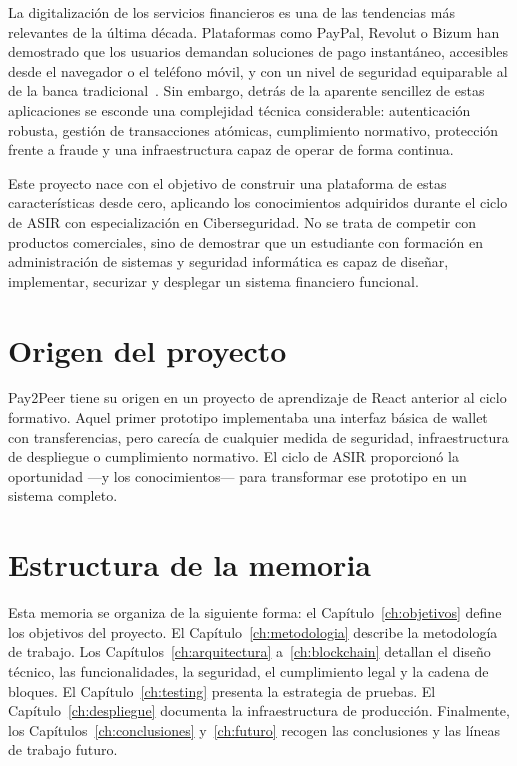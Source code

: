 La digitalización de los servicios financieros es una de las tendencias más relevantes de la última década. Plataformas como PayPal, Revolut o Bizum han demostrado que los usuarios demandan soluciones de pago instantáneo, accesibles desde el navegador o el teléfono móvil, y con un nivel de seguridad equiparable al de la banca tradicional~\cite{owasp}. Sin embargo, detrás de la aparente sencillez de estas aplicaciones se esconde una complejidad técnica considerable: autenticación robusta, gestión de transacciones atómicas, cumplimiento normativo, protección frente a fraude y una infraestructura capaz de operar de forma continua.

Este proyecto nace con el objetivo de construir una plataforma de estas características desde cero, aplicando los conocimientos adquiridos durante el ciclo de ASIR con especialización en Ciberseguridad. No se trata de competir con productos comerciales, sino de demostrar que un estudiante con formación en administración de sistemas y seguridad informática es capaz de diseñar, implementar, securizar y desplegar un sistema financiero funcional.

\section{Origen del proyecto}

Pay2Peer tiene su origen en un proyecto de aprendizaje de React anterior al ciclo formativo. Aquel primer prototipo implementaba una interfaz básica de wallet con transferencias, pero carecía de cualquier medida de seguridad, infraestructura de despliegue o cumplimiento normativo. El ciclo de ASIR proporcionó la oportunidad ---y los conocimientos--- para transformar ese prototipo en un sistema completo.

\section{Estructura de la memoria}

Esta memoria se organiza de la siguiente forma: el Capítulo~\ref{ch:objetivos} define los objetivos del proyecto. El Capítulo~\ref{ch:metodologia} describe la metodología de trabajo. Los Capítulos~\ref{ch:arquitectura} a~\ref{ch:blockchain} detallan el diseño técnico, las funcionalidades, la seguridad, el cumplimiento legal y la cadena de bloques. El Capítulo~\ref{ch:testing} presenta la estrategia de pruebas. El Capítulo~\ref{ch:despliegue} documenta la infraestructura de producción. Finalmente, los Capítulos~\ref{ch:conclusiones} y~\ref{ch:futuro} recogen las conclusiones y las líneas de trabajo futuro.

